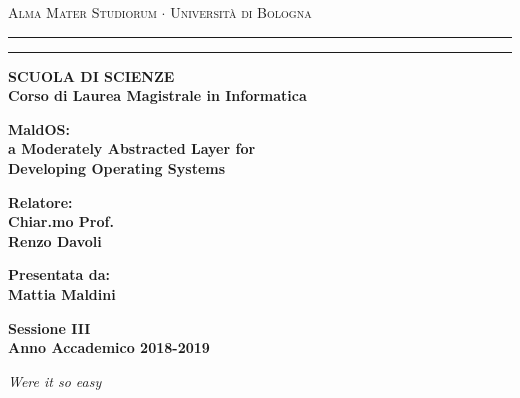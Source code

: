 \documentclass[12pt,a4paper,openright,twoside]{report}
\begin{document}
\begin{titlepage}

\begin{center}
{{\Large{\textsc{Alma Mater Studiorum $\cdot$ Universit\`a di
Bologna}}}} \rule[0.1cm]{15.8cm}{0.1mm}
\rule[0.5cm]{15.8cm}{0.6mm}
{\small{\bf SCUOLA DI SCIENZE\\
Corso di Laurea Magistrale in Informatica }}
\end{center}
\vspace{15mm}
\begin{center}
{\LARGE{\bf MaldOS:}}\\
\vspace{5mm}
{\LARGE{\bf a Moderately Abstracted Layer for}}\\
\vspace{3mm}
{\LARGE{\bf Developing Operating Systems }}\\
\end{center}
\vspace{40mm}
\par
\noindent
\begin{minipage}[t]{0.47\textwidth}
{\large{\bf Relatore:\\
Chiar.mo Prof.\\
Renzo Davoli}}
\end{minipage}
\hfill
\begin{minipage}[t]{0.47\textwidth}\raggedleft
{\large{\bf Presentata da:\\
Mattia Maldini}}
\end{minipage}
\vspace{20mm}
\begin{center}
{\large{\bf Sessione III\\%
Anno Accademico 2018-2019}}%
\end{center}
%
\newpage                                %
\thispagestyle{empty}                   %
\topmargin=6.5cm                        %
\raggedleft                             %
\large                                  %
\em                                     %
Were it so easy
\newpage                                %



\clearpage{\pagestyle{empty}\cleardoublepage}%
\end{titlepage}
\end{document}
